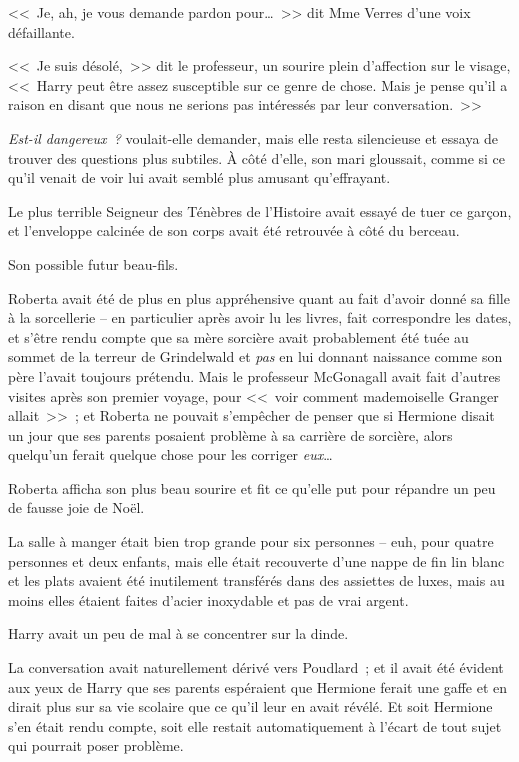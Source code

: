 <<~Je, ah, je vous demande pardon pour…~>> dit Mme Verres d'une voix défaillante.

<<~Je suis désolé,~>> dit le professeur, un sourire plein d'affection sur le visage, <<~Harry peut être assez susceptible sur ce genre de chose. Mais je pense qu'il a raison en disant que nous ne serions pas intéressés par leur conversation.~>>

\emph{Est-il dangereux~?} voulait-elle demander, mais elle resta silencieuse et essaya de trouver des questions plus subtiles. À côté d'elle, son mari gloussait, comme si ce qu'il venait de voir lui avait semblé plus amusant qu'effrayant.

Le plus terrible Seigneur des Ténèbres de l'Histoire avait essayé de tuer ce garçon, et l'enveloppe calcinée de son corps avait été retrouvée à côté du berceau.

Son possible futur beau-fils.

Roberta avait été de plus en plus appréhensive quant au fait d'avoir donné sa fille à la sorcellerie -- en particulier après avoir lu les livres, fait correspondre les dates, et s'être rendu compte que sa mère sorcière avait probablement été tuée au sommet de la terreur de Grindelwald et \emph{pas} en lui donnant naissance comme son père l'avait toujours prétendu. Mais le professeur McGonagall avait fait d'autres visites après son premier voyage, pour <<~voir comment mademoiselle Granger allait~>>~; et Roberta ne pouvait s'empêcher de penser que si Hermione disait un jour que ses parents posaient problème à sa carrière de sorcière, alors quelqu'un ferait quelque chose pour les corriger \emph{eux}…

Roberta afficha son plus beau sourire et fit ce qu'elle put pour répandre un peu de fausse joie de Noël.

\later

La salle à manger était bien trop grande pour six personnes -- euh, pour quatre personnes et deux enfants, mais elle était recouverte d'une nappe de fin lin blanc et les plats avaient été inutilement transférés dans des assiettes de luxes, mais au moins elles étaient faites d'acier inoxydable et pas de vrai argent.

Harry avait un peu de mal à se concentrer sur la dinde.

La conversation avait naturellement dérivé vers Poudlard~; et il avait été évident aux yeux de Harry que ses parents espéraient que Hermione ferait une gaffe et en dirait plus sur sa vie scolaire que ce qu'il leur en avait révélé. Et soit Hermione s'en était rendu compte, soit elle restait automatiquement à l'écart de tout sujet qui pourrait poser problème.

